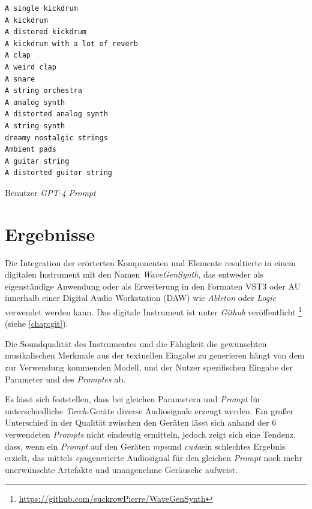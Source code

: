 \documentclass[
  a4paper,  %
  twoside,  %
  bibliography=totoc,
  headsepline,
  cleardoublepage=empty,
  parskip=half,
  draft=false
]{scrbook}
\begin{document}
{\begin{Listing}
\begin{lstlisting}[style=gpt]
A single kickdrum
A kickdrum
A distored kickdrum
A kickdrum with a lot of reverb
A clap
A weird clap
A snare
A string orchestra
A analog synth
A distorted analog synth
A string synth
dreamy nostalgic strings
Ambient pads
A guitar string
A distorted guitar string
\end{lstlisting}
    \caption{Benutzer \emph{GPT-4} \emph{Prompt}}
  \label{lst:prompt}
\end{Listing}

\chapter{Ergebnisse}
Die Integration der erörterten Komponenten und Elemente resultierte in einem digitalen Instrument mit den Namen \emph{WaveGenSynth}, das entweder als eigenständige Anwendung oder als Erweiterung in den Formaten VST3 oder AU innerhalb einer Digital Audio Workstation (DAW) wie \emph{Ableton} \cite{noauthor_ableton_nodate} oder \emph{Logic} \cite{noauthor_logic_nodate} verwendet werden kann. Das digitale Instrument ist unter \emph{Github} \cite{noauthor_github_nodate} veröffentlicht \footnote{\url{https://github.com/suckrowPierre/WaveGenSynth}} (siehe \ref{chap:git}). 

Die Soundqualität des Instrumentes und die Fähigkeit die gewünschten musikalischen Merkmale aus der textuellen Eingabe zu generieren hängt von dem zur Verwendung kommenden Modell, und der Nutzer spezifischen Eingabe der Parameter und des \emph{Promptes} ab. 

Es lässt sich feststellen, dass bei gleichen Parametern und \emph{Prompt} für unterschiedliche \emph{Torch}-Geräte diverse Audiosignale erzeugt werden. Ein großer Unterschied in der Qualität zwischen den Geräten lässt sich anhand der $6$ verwendeten \emph{Prompts} nicht eindeutig ermitteln, jedoch zeigt sich eine Tendenz, dass, wenn ein \emph{Prompt} auf den Geräten \glqq\emph{mps}\grqq und \glqq\emph{cuda}\grqq ein schlechtes Ergebnis erzielt, das mittels \glqq\emph{cpu}\grqq generierte Audiosignal für den gleichen \emph{Prompt} noch mehr unerwünschte Artefakte und unangenehme Geräusche aufweist.

}
\end{document}

